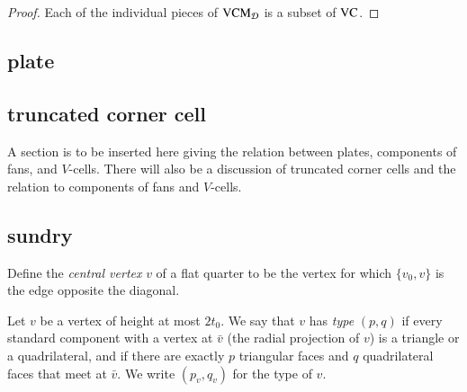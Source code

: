 \begin{proof}  Each of the individual pieces of ${\operatorname{VCM}}_{{\mathcal D}}$ is a subset of ${\operatorname{VC}}$.
\end{proof}





\subsection{plate}
\subsection{truncated corner cell}

A section is to be inserted here giving the relation between
plates, components of fans, and $V$-cells.  There will also
be a discussion of truncated corner cells and the relation to
components of fans and $V$-cells.%




\subsection{sundry}



\begin{definition}
Define the {\it central vertex\/} $v$ of a flat quarter to be the
vertex for which $\{v_0,v\}$ is the edge opposite the diagonal.
\end{definition}


\begin{definition}[type]
Let $v$ be a vertex of height at most $2t_0$.  We say that $v$ has
{\it type\/} $(p,q)$ if every standard component with a vertex at $\bar
v$ (the radial projection of $v$) is a triangle or a quadrilateral,
and if there are exactly $p$ triangular faces and $q$ quadrilateral
faces that meet at $\bar v$.  We write $(p_v,q_v)$ for the type of
$v$.
\end{definition}


